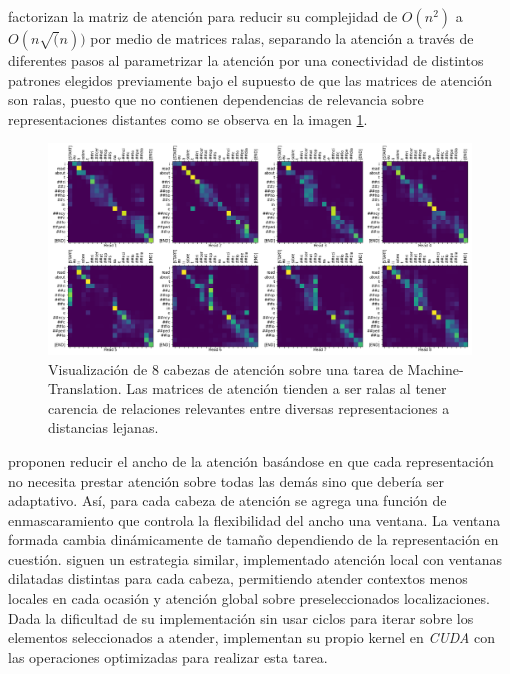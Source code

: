 \citeauthor*{DBLP:journals/corr/abs-1904-10509} factorizan la matriz de atención para reducir su complejidad
de $O(n^2)$ a $O(n\sqrt(n))$ por medio de matrices ralas, separando la atención a través de diferentes
pasos al parametrizar la atención por una conectividad de distintos patrones elegidos previamente bajo el supuesto
de que las matrices de atención son ralas, puesto que no contienen dependencias de relevancia
sobre representaciones distantes como se observa en la imagen \ref{fig:att-spar}.

\begin{figure}[ht!]
    \centering
    \includegraphics[width=0.7 \textwidth]{Chapters/1. Transformer/Figures/transformer/head_sparsity.png}
    \caption{Visualización de 8 cabezas de atención sobre una tarea de Machine-Translation. Las
    matrices de atención tienden a ser ralas al tener carencia de relaciones relevantes entre diversas
    representaciones a distancias lejanas.}
    \label{fig:att-spar}
\end{figure}

\citeauthor*{DBLP:journals/corr/abs-1905-07799} proponen reducir el ancho de la atención basándose en
que cada representación no necesita prestar atención sobre todas las demás sino que debería ser
adaptativo. Así, para cada cabeza de atención se agrega una función de enmascaramiento que controla
la flexibilidad del ancho una ventana. La ventana formada cambia dinámicamente de tamaño
dependiendo de la representación en cuestión.
\citeauthor*{DBLP:journals/corr/abs-2004-05150} siguen un estrategia similar, implementado
atención local con ventanas dilatadas distintas para cada cabeza, permitiendo atender contextos menos
locales en cada ocasión y atención global sobre preseleccionados localizaciones. Dada la dificultad de
su implementación sin usar ciclos para iterar sobre los elementos seleccionados a atender, implementan
su propio kernel en \textit{CUDA} con las operaciones optimizadas para realizar esta tarea.


